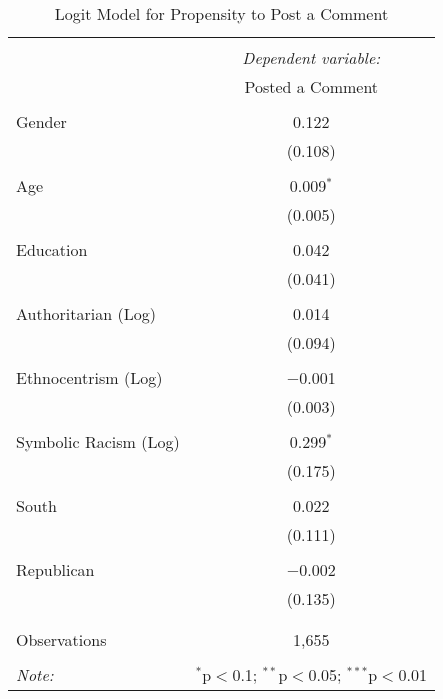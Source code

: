 
\begin{table}[H] \centering 
  \caption{Logit Model for Propensity to Post a Comment} 
  \label{} 
\begin{tabular}{@{\extracolsep{5pt}}lc} 
\\[-1.8ex]\hline 
\hline \\[-1.8ex] 
 & \multicolumn{1}{c}{\textit{Dependent variable:}} \\ 
\cline{2-2} 
 & Posted a Comment \\ 
\hline \\[-1.8ex] 
 Gender & 0.122 \\ 
  & (0.108) \\ 
  & \\ 
 Age & 0.009$^{*}$ \\ 
  & (0.005) \\ 
  & \\ 
 Education & 0.042 \\ 
  & (0.041) \\ 
  & \\ 
 Authoritarian (Log) & 0.014 \\ 
  & (0.094) \\ 
  & \\ 
 Ethnocentrism (Log) & $-$0.001 \\ 
  & (0.003) \\ 
  & \\ 
 Symbolic Racism (Log) & 0.299$^{*}$ \\ 
  & (0.175) \\ 
  & \\ 
 South & 0.022 \\ 
  & (0.111) \\ 
  & \\ 
 Republican & $-$0.002 \\ 
  & (0.135) \\ 
  & \\ 
\hline \\[-1.8ex] 
Observations & 1,655 \\ 
\hline 
\hline \\[-1.8ex] 
\textit{Note:}  & \multicolumn{1}{r}{$^{*}$p$<$0.1; $^{**}$p$<$0.05; $^{***}$p$<$0.01} \\ 
\end{tabular} 
\end{table} 
